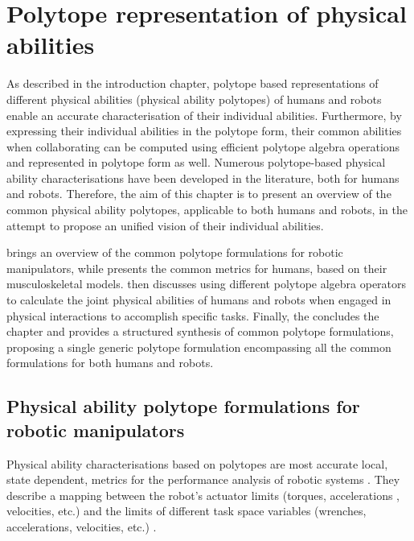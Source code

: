 \chapter{Polytope representation of physical abilities} %
\label{ch:phisical_ability_metrics} 

As described in the introduction chapter, polytope based representations of different physical abilities (physical ability polytopes) of humans and robots enable an accurate characterisation of their individual abilities. Furthermore, by expressing their individual abilities in the polytope form, their common abilities when collaborating can be computed using efficient polytope algebra operations and represented in polytope form as well. 
Numerous polytope-based physical ability characterisations have been developed in the literature, both for humans and robots. Therefore, the aim of this chapter is to present an overview of the common physical ability polytopes, applicable to both humans and robots, in the attempt to propose an unified vision of their individual abilities.  

 brings an overview of the common polytope formulations for robotic manipulators, while  presents the common metrics for humans, based on their musculoskeletal models. 
 then discusses using different polytope algebra operators to calculate the joint physical abilities of humans and robots when engaged in physical interactions to accomplish specific tasks.
Finally, the  concludes the chapter and provides a structured synthesis of common polytope formulations, proposing a single generic polytope formulation encompassing all the common formulations for both humans and robots.

\section{Physical ability polytope formulations for robotic manipulators}
\label{ch:robot_metrics}

Physical ability characterisations based on polytopes are most accurate local, state dependent, metrics for the performance analysis of robotic systems \cite{pholsiri2005real,Finotello1998}. They describe a mapping between the robot's actuator limits (torques, accelerations , velocities, etc.) and the limits of different task space variables (wrenches, accelerations, velocities, etc.) . 

